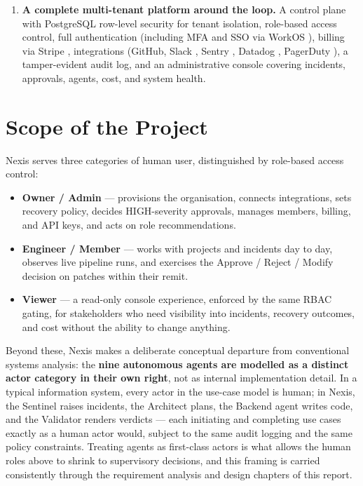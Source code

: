 \begin{enumerate}
    and downgrades for organisation members, each with a plain-language,
    evidence-backed rationale that an administrator can accept or dismiss.
  \item \textbf{A complete multi-tenant platform around the loop.} A
    control plane with PostgreSQL row-level security \cite{pgrls} for
    tenant isolation, role-based access control, full authentication
    (including MFA and SSO via WorkOS \cite{workos}), billing via Stripe
    \cite{stripe}, integrations (GitHub, Slack \cite{slackapi}, Sentry
    \cite{sentry}, Datadog \cite{datadog}, PagerDuty \cite{pagerduty}), a
    tamper-evident audit log, and an administrative console covering
    incidents, approvals, agents, cost, and system health.
\end{enumerate}

\section{Scope of the Project}

Nexis serves three categories of human user, distinguished by role-based
access control:

\begin{itemize}
  \item \textbf{Owner / Admin} --- provisions the organisation, connects
    integrations, sets recovery policy, decides HIGH-severity approvals,
    manages members, billing, and API keys, and acts on role
    recommendations.
  \item \textbf{Engineer / Member} --- works with projects and incidents
    day to day, observes live pipeline runs, and exercises the Approve /
    Reject / Modify decision on patches within their remit.
  \item \textbf{Viewer} --- a read-only console experience, enforced by the
    same RBAC gating, for stakeholders who need visibility into incidents,
    recovery outcomes, and cost without the ability to change anything.
\end{itemize}

Beyond these, Nexis makes a deliberate conceptual departure from conventional
systems analysis: the \textbf{nine autonomous agents are modelled as a
distinct actor category in their own right}, not as internal implementation
detail. In a typical information system, every actor in the use-case model is
human; in Nexis, the Sentinel raises incidents, the Architect plans,
the Backend agent writes code, and the Validator renders verdicts --- each
initiating and completing use cases exactly as a human actor would, subject to
the same audit logging and the same policy constraints. Treating agents as
first-class actors is what allows the human roles above to shrink to
supervisory decisions, and this framing is carried consistently through the
requirement analysis and design chapters of this report.


